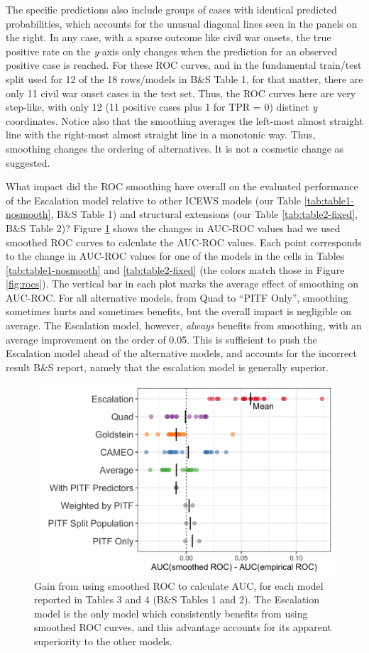 \documentclass[
]{article}
\begin{document}
The specific predictions also include groups of cases with identical predicted probabilities, which accounts for the unusual diagonal lines seen in the panels on the right. In any case, with a sparse outcome like civil war onsets, the true positive rate on the \emph{y}-axis only changes when the prediction for an observed positive case is reached. For these ROC curves, and in the fundamental train/test split used for 12 of the 18 rows/models in B\&S Table 1, for that matter, there are only 11 civil war onset cases in the test set. Thus, the ROC curves here are very step-like, with only 12 (11 positive cases plus 1 for TPR = 0) distinct \emph{y} coordinates. Notice also that the smoothing averages the left-most almost straight line with the right-most almost straight line in a monotonic way. Thus, smoothing changes the ordering of alternatives. It is not a cosmetic change as suggested.

What impact did the ROC smoothing have overall on the evaluated performance of the Escalation model relative to other ICEWS models (our Table \ref{tab:table1-nosmooth}, B\&S Table 1) and structural extensions (our Table \ref{tab:table2-fixed}, B\&S Table 2)? Figure \ref{fig:benefit-plot} shows the changes in AUC-ROC values had we used smoothed ROC curves to calculate the AUC-ROC values. Each point corresponds to the change in AUC-ROC values for one of the models in the cells in Tables \ref{tab:table1-nosmooth} and \ref{tab:table2-fixed} (the colors match those in Figure \ref{fig:rocs}). The vertical bar in each plot marks the average effect of smoothing on AUC-ROC. For all alternative models, from Quad to ``PITF Only'', smoothing sometimes hurts and sometimes benefits, but the overall impact is negligible on average. The Escalation model, however, \emph{always} benefits from smoothing, with an average improvement on the order of 0.05. This is sufficient to push the Escalation model ahead of the alternative models, and accounts for the incorrect result B\&S report, namely that the escalation model is generally superior.

\begin{figure}
\caption{Gain from using smoothed ROC to calculate AUC, for each model reported in Tables 3 and 4 (B\&S Tables 1 and 2). The Escalation model is the only model which consistently benefits from using smoothed ROC curves, and this advantage accounts for its apparent superiority to the other models.\label{fig:benefit-plot}}
\centering
\includegraphics[width=.8\linewidth]{figures/fig-2-benefit-plot.png}
\end{figure}
\end{document}
